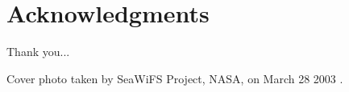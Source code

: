 \section*{Acknowledgments}
Thank you...

\vspace*{\fill}
Cover photo taken by SeaWiFS Project, NASA, on March 28 2003 \cite{nasaHazeEurope2003}. 